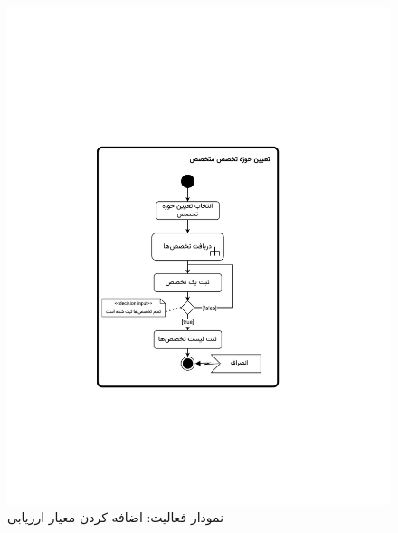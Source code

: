 \begin{figure}
	\centering
	\includegraphics[scale=0.8, page=9]{figs/OOD-activity21-30.pdf}
	\caption{نمودار فعالیت: اضافه کردن معیار ارزیابی}
\end{figure}
\FloatBarrier
\newpage

